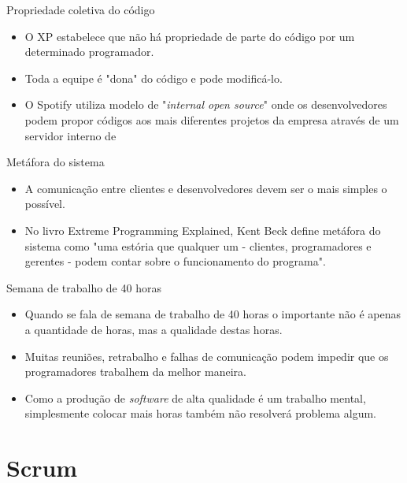 \documentclass[11pt]{beamer}
\begin{document}
    \begin{frame}{Propriedade coletiva do código}
      \begin{itemize}
         \item O XP estabelece que não há propriedade de parte do código por um determinado programador.
         \item Toda a equipe é "dona" do código e pode modificá-lo.
         \item O Spotify utiliza modelo de "\textit{internal open source}" onde os desenvolvedores podem propor códigos aos mais diferentes projetos da empresa através de um servidor interno de
      \end{itemize}
    \end{frame}

    \begin{frame}{Metáfora do sistema}
      \begin{itemize}
         \item A comunicação entre clientes e desenvolvedores devem ser o mais simples o possível.
         \item No livro Extreme Programming Explained, Kent Beck define metáfora do sistema como "uma estória que qualquer um - clientes, programadores e gerentes - podem contar sobre o funcionamento do programa".
      \end{itemize}
    \end{frame}

    \begin{frame}{Semana de trabalho de 40 horas}
      \begin{itemize}
         \item Quando se fala de semana de trabalho de 40 horas o importante não é apenas a quantidade de horas, mas a qualidade destas horas.
         \item Muitas reuniões, retrabalho e falhas de comunicação podem impedir que os programadores trabalhem da melhor maneira.
         \item Como a produção de \textit{software} de alta qualidade é um trabalho mental, simplesmente colocar mais horas também não resolverá problema algum.
      \end{itemize}
    \end{frame}

   \section{Scrum}
\end{document}
